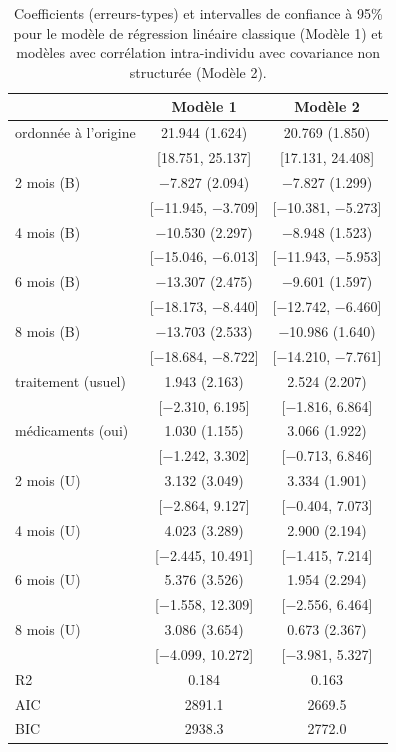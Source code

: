 \documentclass[
  11pt,
  letterpaper,
]{article}
\theoremstyle{definition}
\theoremstyle{definition}
\theoremstyle{definition}
\theoremstyle{definition}
\theoremstyle{remark}
\begin{document}
\begin{table}

\caption{\label{tab:coefbeattheblues}Coefficients (erreurs-types) et intervalles de confiance à 95\% pour le modèle de régression linéaire classique (Modèle 1) et modèles avec corrélation intra-individu avec covariance non structurée (Modèle 2).}
\centering
\begin{tabular}[t]{lcc}
\toprule
  & Modèle 1 & Modèle 2\\
\midrule
ordonnée à l'origine & \num{21.944} (\num{1.624}) & \num{20.769} (\num{1.850})\\
 & {}[\num{18.751}, \num{25.137}] & {}[\num{17.131}, \num{24.408}]\\
2 mois (B) & \num{-7.827} (\num{2.094}) & \num{-7.827} (\num{1.299})\\
 & {}[\num{-11.945}, \num{-3.709}] & {}[\num{-10.381}, \num{-5.273}]\\
4 mois (B) & \num{-10.530} (\num{2.297}) & \num{-8.948} (\num{1.523})\\
 & {}[\num{-15.046}, \num{-6.013}] & {}[\num{-11.943}, \num{-5.953}]\\
6 mois (B) & \num{-13.307} (\num{2.475}) & \num{-9.601} (\num{1.597})\\
 & {}[\num{-18.173}, \num{-8.440}] & {}[\num{-12.742}, \num{-6.460}]\\
8 mois (B) & \num{-13.703} (\num{2.533}) & \num{-10.986} (\num{1.640})\\
 & {}[\num{-18.684}, \num{-8.722}] & {}[\num{-14.210}, \num{-7.761}]\\
traitement (usuel) & \num{1.943} (\num{2.163}) & \num{2.524} (\num{2.207})\\
 & {}[\num{-2.310}, \num{6.195}] & {}[\num{-1.816}, \num{6.864}]\\
médicaments (oui) & \num{1.030} (\num{1.155}) & \num{3.066} (\num{1.922})\\
 & {}[\num{-1.242}, \num{3.302}] & {}[\num{-0.713}, \num{6.846}]\\
2 mois (U) & \num{3.132} (\num{3.049}) & \num{3.334} (\num{1.901})\\
 & {}[\num{-2.864}, \num{9.127}] & {}[\num{-0.404}, \num{7.073}]\\
4 mois (U) & \num{4.023} (\num{3.289}) & \num{2.900} (\num{2.194})\\
 & {}[\num{-2.445}, \num{10.491}] & {}[\num{-1.415}, \num{7.214}]\\
6 mois (U) & \num{5.376} (\num{3.526}) & \num{1.954} (\num{2.294})\\
 & {}[\num{-1.558}, \num{12.309}] & {}[\num{-2.556}, \num{6.464}]\\
8 mois (U) & \num{3.086} (\num{3.654}) & \num{0.673} (\num{2.367})\\
 & {}[\num{-4.099}, \num{10.272}] & {}[\num{-3.981}, \num{5.327}]\\
\midrule
R2 & \num{0.184} & \num{0.163}\\
AIC & \num{2891.1} & \num{2669.5}\\
BIC & \num{2938.3} & \num{2772.0}\\
\bottomrule
\end{tabular}
\end{table}
\end{document}

